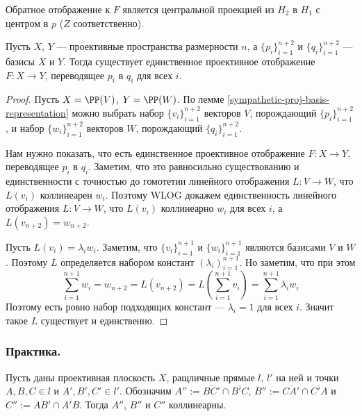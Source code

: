 \documentclass[12pt,a4paper]{article}
\begin{document}
    \begin{remark}
        Обратное отображение к $F$ является центральной проекцией из $H_2$ в $H_1$ с центром в $p$ ($Z$ соответственно).
    \end{remark}

    \begin{theorem}
        Пусть $X$, $Y$ --- проективные пространства размерности $n$, а $\{p_i\}_{i=1}^{n+2}$ и $\{q_i\}_{i=1}^{n+2}$ --- базисы $X$ и $Y$. Тогда существует единственное проективное отображение $F: X \to Y$, переводящее $p_i$ в $q_i$ для всех $i$.
    \end{theorem}

    \begin{proof}
        Пусть $X = \PP(V)$, $Y = \PP(W)$. По лемме \ref{sympathetic-proj-basis-representation} можно выбрать набор $\{v_i\}_{i=1}^{n+2}$ векторов $V$, порождающий $\{p_i\}_{i=1}^{n+2}$, и набор $\{w_i\}_{i=1}^{n+2}$ векторов $W$, порождающий $\{q_i\}_{i=1}^{n+2}$.

        Нам нужно показать, что есть единственное проективное отображение $F: X \to Y$, переводящее $p_i$ в $q_i$. Заметим, что это равносильно существованию и единственности с точностью до гомотетии линейного отображения $L: V \to W$, что $L(v_i)$ коллинеарен $w_i$. Поэтому WLOG докажем единственность линейного отображения $L: V \to W$, что $L(v_i)$ коллинеарно $w_i$ для всех $i$, а $L(v_{n+2}) = w_{n+2}$.

        Пусть $L(v_i) = \lambda_i w_i$. Заметим, что $\{v_i\}_{i=1}^{n+1}$ и $\{w_i\}_{i=1}^{n+1}$ являются базисами $V$ и $W$. Поэтому $L$ определяется набором констант $(\lambda_i)_{i=1}^{n+1}$. Но заметим, что при этом
        \[\sum_{i=1}^{n+1} w_i = w_{n+2} = L(v_{n+2}) = L\left(\sum_{i=1}^{n+1} v_i\right) = \sum_{i=1}^{n+1} \lambda_i w_i\]
        Поэтому есть ровно набор подходящих констант --- $\lambda_i = 1$ для всех $i$. Значит такое $L$ существует и единственно.
    \end{proof}

    \subsubsection{Практика.}

    \begin{theorem}
        Пусть даны проективная плоскость $X$, ращличные прямые $l$, $l'$ на ней и точки $A, B, C \in l$ и $A', B', C' \in l'$. Обозначим $A'' := \overline{BC'} \cap \overline{B'C}$, $B'' := \overline{CA'} \cap \overline{C'A}$ и $C'' := \overline{AB'} \cap \overline{A'B}$. Тогда $A''$, $B''$ и $C''$ коллинеарны.
    \end{theorem}
\end{document}
